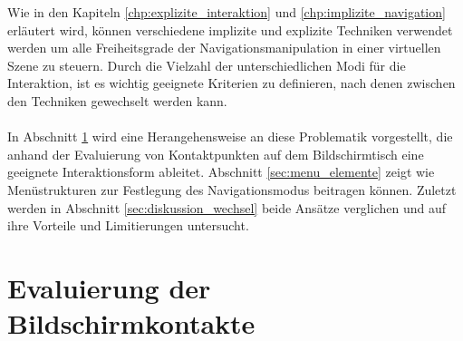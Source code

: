 Wie in den Kapiteln \ref{chp:explizite_interaktion} und \ref{chp:implizite_navigation} erläutert wird, können verschiedene implizite und explizite Techniken verwendet werden um alle Freiheitsgrade der Navigationsmanipulation in einer virtuellen Szene zu steuern. Durch die Vielzahl der unterschiedlichen Modi für die Interaktion, ist es wichtig geeignete Kriterien zu definieren, nach denen zwischen den Techniken gewechselt werden kann. 
\\\\
In Abschnitt \ref{sec:evaluierung_der_bildschirmkontakte} wird eine Herangehensweise an diese Problematik vorgestellt, die anhand der Evaluierung von Kontaktpunkten auf dem Bildschirmtisch eine geeignete Interaktionsform ableitet. Abschnitt \ref{sec:menu_elemente} zeigt wie Menüstrukturen zur Festlegung des Navigationsmodus beitragen können. Zuletzt werden in Abschnitt \ref{sec:diskussion_wechsel} beide Ansätze verglichen und auf ihre Vorteile und Limitierungen untersucht.


\section{Evaluierung der Bildschirmkontakte}
\label{sec:evaluierung_der_bildschirmkontakte}

